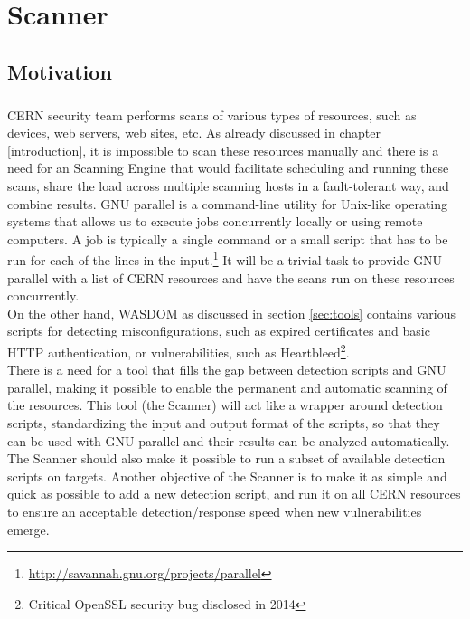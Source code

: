 \chapter{Scanner}
\label{chap4-scanner}
\thispagestyle{empty}

\section{Motivation}

\paragraph{}

CERN security team performs scans of various types of resources, such as devices, web servers, web sites, etc. As already discussed in chapter \ref{introduction}, it is impossible to scan these resources manually and there is a need for an Scanning Engine that would facilitate scheduling and running these scans, share the load across multiple scanning hosts in a fault-tolerant way, and combine results.
GNU parallel is a command-line utility for Unix-like operating systems that allows us to execute jobs concurrently locally or using remote computers. A job is typically a single command or a small script that has to be run for each of the lines in the input.\footnote{\url{http://savannah.gnu.org/projects/parallel}} It will be a trivial task to provide GNU parallel with a list of CERN resources and have the scans run on these resources concurrently.
\\ 
On the other hand, WASDOM as discussed in section \ref{sec:tools} contains various scripts for detecting misconfigurations, such as expired certificates and basic HTTP authentication, or vulnerabilities, such as Heartbleed\footnote{Critical OpenSSL security bug disclosed in 2014}. 
\\
There is a need for a tool that fills the gap between detection scripts and GNU parallel, making it possible to enable the permanent and automatic scanning of the resources. This tool (the Scanner) will act like a wrapper around detection scripts, standardizing the input and output format of the scripts, so that they can be used with GNU parallel and their results can be analyzed automatically. The Scanner should also make it possible to run a subset of available detection scripts on targets. Another objective of the Scanner is to make it as simple and quick as possible to add a new detection script, and run it on all CERN resources to ensure an acceptable detection/response speed when new vulnerabilities emerge.

